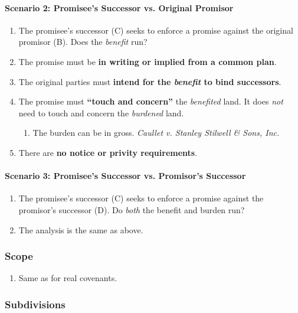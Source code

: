 \paragraph{Scenario 2: Promisee's Successor vs. Original Promisor}

\begin{enumerate}
    \item The promisee's successor (C) seeks to enforce a promise against the 
    original promisor (B). Does the \emph{benefit} run?
    \item The promise must be \textbf{in writing or implied from a common 
    plan}.
    \item The original parties must \textbf{intend for the \emph{benefit} to 
    bind successors}.
    \item The promise must \textbf{``touch and concern''} the \emph{benefited} 
    land. It does \emph{not} need to touch and concern the \emph{burdened} 
    land.
    \begin{enumerate}
        \item The burden can be in gross. \emph{Caullet v. Stanley Stilwell \& 
        Sons, Inc.}
    \end{enumerate}
    \item There are \textbf{no notice or privity requirements}.
\end{enumerate}

\paragraph{Scenario 3: Promisee's Successor vs. Promisor's Successor}

\begin{enumerate}
    \item The promisee's successor (C) seeks to enforce a promise against the 
    promisor's successor (D). Do \emph{both} the benefit and burden run?
    \item The analysis is the same as above.
\end{enumerate}

\subsubsection{Scope}

\begin{enumerate}
    \item Same as for real covenants.
\end{enumerate}

\subsubsection{Subdivisions}


